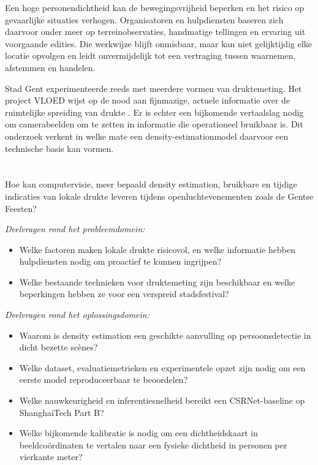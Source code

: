 Een hoge personendichtheid kan de bewegingsvrijheid beperken en het risico op gevaarlijke situaties verhogen. Organisatoren en hulpdiensten baseren zich daarvoor onder meer op terreinobservaties, handmatige tellingen en ervaring uit voorgaande edities. Die werkwijze blijft onmisbaar, maar kan niet gelijktijdig elke locatie opvolgen en leidt onvermijdelijk tot een vertraging tussen waarnemen, afstemmen en handelen.

Stad Gent experimenteerde reeds met meerdere vormen van druktemeting. Het project VLOED wijst op de nood aan fijnmazige, actuele informatie over de ruimtelijke spreiding van drukte \autocite{StadGentVloed}. Er is echter een bijkomende vertaalslag nodig om camerabeelden om te zetten in informatie die operationeel bruikbaar is. Dit onderzoek verkent in welke mate een density-estimationmodel daarvoor een technische basis kan vormen.

\section{}%
\label{sec:onderzoeksvraag}

Hoe kan computervisie, meer bepaald density estimation, bruikbare en tijdige indicaties van lokale drukte leveren tijdens openluchtevenementen zoals de Gentse Feesten?

\textit{Deelvragen rond het probleemdomein:}
\begin{itemize}
    \item Welke factoren maken lokale drukte risicovol, en welke informatie hebben hulpdiensten nodig om proactief te kunnen ingrijpen?
    \item Welke bestaande technieken voor druktemeting zijn beschikbaar en welke beperkingen hebben ze voor een verspreid stadsfestival?
\end{itemize}

\textit{Deelvragen rond het oplossingsdomein:}
\begin{itemize}
    \item Waarom is density estimation een geschikte aanvulling op persoonsdetectie in dicht bezette scènes?
    \item Welke dataset, evaluatiemetrieken en experimentele opzet zijn nodig om een eerste model reproduceerbaar te beoordelen?
    \item Welke nauwkeurigheid en inferentiesnelheid bereikt een CSRNet-baseline op ShanghaiTech Part B?
    \item Welke bijkomende kalibratie is nodig om een dichtheidskaart in beeldcoördinaten te vertalen naar een fysieke dichtheid in personen per vierkante meter?
\end{itemize}

